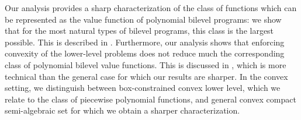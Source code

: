 \documentclass{article}
\theoremstyle{plain}
\theoremstyle{definition}
\begin{document}
Our analysis provides a sharp characterization of the class of functions which can be represented as the value function of polynomial bilevel programs: we show that for the most natural types of bilevel programs, this class is the largest possible. This is described in . Furthermore, our analysis shows that enforcing convexity of the lower-level problems does not reduce much the corresponding class of polynomial bilevel value functions. %
This is discussed in , which is more technical than the general case for which our results are sharper. In the convex setting, we distinguish between box-constrained convex lower level, which we relate to the class of piecewise polynomial functions, and general convex compact semi-algebraic set for which we obtain a sharper characterization.


		
\end{document}
